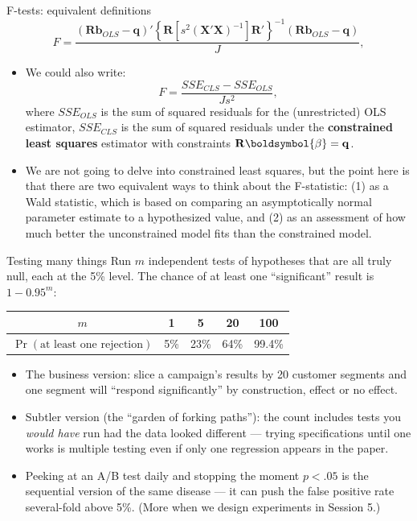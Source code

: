 \documentclass[aspectratio=169,11pt]{beamer}
\begin{document}
\begin{frame}{F-tests: equivalent definitions}
\[
F=\frac{\left(\boldsymbol{R}\boldsymbol{b}_{OLS}-\boldsymbol{q}\right)'\left\{ \boldsymbol{R}\left[s^{2}\left(\boldsymbol{X}'\boldsymbol{X}\right)^{-1}\right]\boldsymbol{R}'\right\} ^{-1}\left(\boldsymbol{R}\boldsymbol{b}_{OLS}-\boldsymbol{q}\right)}{J},
\]
\begin{itemize}
	\item We could also write:\[
		F = \frac{SSE_{CLS} - SSE_{OLS}}{Js^2},
	\]
	where $SSE_{OLS}$ is the sum of squared residuals for the (unrestricted) OLS estimator, $SSE_{CLS}$
	is the sum of squared residuals under the {\bf constrained least squares} estimator with constraints ${\bf R} \boldsymbol{\beta} = {\bf q}$.

	\item We are not going to delve into constrained least squares, but the point here is that there are two equivalent ways to think about
	the F-statistic: (1) as a Wald statistic, which is based on comparing an asymptotically normal parameter estimate to a hypothesized value, 
	and (2) as an assessment of how much better the unconstrained model fits than the constrained model. 
\end{itemize}
\end{frame}





\begin{frame}{Testing many things}
Run $m$ independent tests of hypotheses that are \alert{all truly null}, each at the
5\% level. The chance of at least one ``significant'' result is $1 - 0.95^{m}$:
\begin{center}
\begin{tabular}{ccccc}
$m$ & 1 & 5 & 20 & 100 \\
\hline
$\Pr(\text{at least one rejection})$ & 5\% & 23\% & \alert{64\%} & 99.4\% \\
\end{tabular}
\end{center}
\bigskip
\begin{itemize}
	\item The business version: slice a campaign's results by 20 customer segments
	and one segment will ``respond significantly'' \alert{by construction}, effect or no effect.

	\item Subtler version (the ``garden of forking paths''): the count includes tests
	you \emph{would have} run had the data looked different --- trying specifications
	until one works is multiple testing even if only one regression appears in the
	paper.

	\item Peeking at an A/B test daily and stopping the moment $p < .05$ is the
	sequential version of the same disease --- it can push the false positive rate
	several-fold above 5\%. (More when we design experiments in Session 5.)
\end{itemize}
\end{frame}
\end{document}
